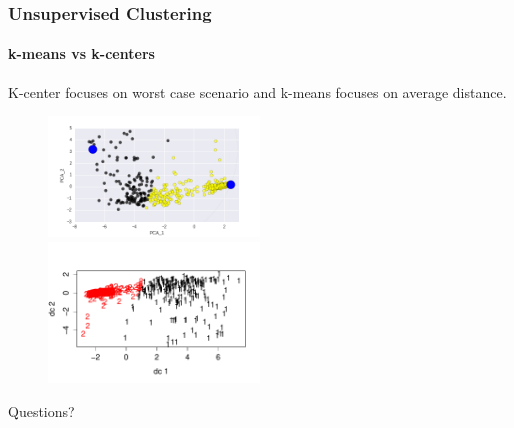 \documentclass[10pt]{beamer}
\begin{document}
    \begin{frame}
    \frametitle{Unsupervised Clustering}
    \framesubtitle{k-means vs k-centers}

    K-center focuses on worst case scenario and k-means focuses on average distance.

    \begin{figure}
    \centering
    \includegraphics[width=0.5\textwidth]{m1.png}
    \includegraphics[width=0.5\textwidth]{2.pdf}
    \end{figure}

    \end{frame}


    \begin{frame}
    \begin{center}
    \Large
    Questions?
    \end{center}

    \end{frame}
\end{document}
